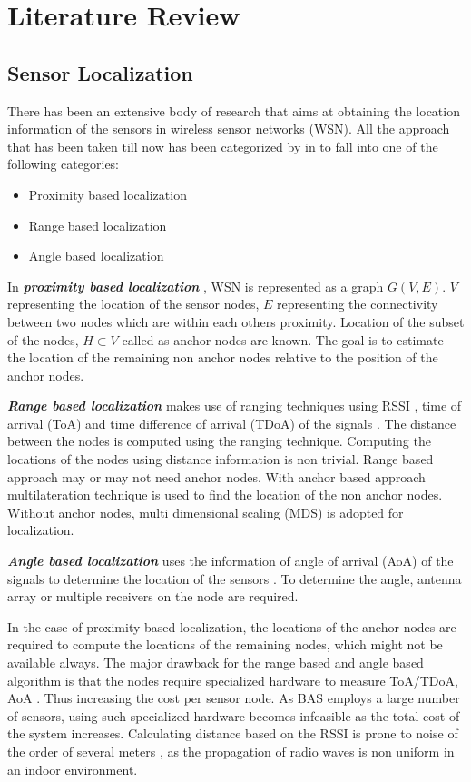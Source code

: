 \chapter{Literature Review}
\section{Sensor Localization}
There has been an extensive body of research that aims at obtaining the location information of the sensors in wireless sensor networks (WSN). All the approach that has been taken till now has been categorized by \citeauthor{wang2010survey} in \cite{wang2010survey} to fall into one of the following categories:
\begin{itemize}
\item Proximity based localization
\item Range based localization
\item Angle based localization
\end{itemize}

In \textbf{\textit{proximity based localization}} \cite{bulusu2000gps,4317866,shang2003localization}, WSN is represented as a graph $G(V,E)$. $V$ representing the location of the sensor nodes, $E$ representing the connectivity between two nodes which are within each others proximity. Location of the  subset of the nodes, $H \subset V$ called as anchor nodes are known. The goal is to estimate the location of the remaining non anchor nodes relative to the position of the anchor nodes. 

\textbf{\textit{Range based localization}} makes use of  ranging techniques using RSSI \cite{mao2007path}, time of arrival (ToA) \cite{moses2003self} and time difference of arrival (TDoA) of the signals \cite{4058681}. The distance between the nodes is computed using the ranging technique. Computing the locations of the nodes using distance information is non trivial. Range based approach may or may not need anchor nodes. With anchor based approach multilateration technique is used to find the location of the non anchor nodes. Without anchor nodes, multi dimensional scaling (MDS) is adopted for localization. 

\textbf{\textit{Angle based  localization}} uses the information of angle of arrival (AoA) of the signals to determine the location of the sensors \cite{nasipuri2002directionality,rong2006angle}. To determine the angle, antenna array or multiple receivers on the node are required.

In the case of proximity based localization, the locations of the anchor nodes are required to compute the locations of the remaining nodes, which might not be available always. The major drawback for the range based and angle based algorithm is that the nodes require specialized hardware to measure ToA/TDoA, AoA \cite{4317866}. Thus increasing the cost per sensor node. As BAS employs a large number of sensors, using such specialized hardware becomes infeasible as the total cost of the system increases. Calculating distance based on the RSSI is prone to noise of the order of several meters \cite{bachrach2005localization}, as the propagation of radio waves is non uniform in an indoor environment.

